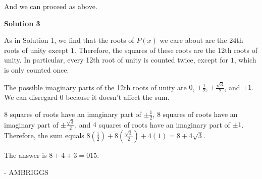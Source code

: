 \begin{enumerate}
 And we can proceed as above.

 



\textbf{Solution 3}

As in Solution 1, we find that the roots of $P(x)$ we care about are the 24th roots of unity except $1$. Therefore, the squares of these roots are the 12th roots of unity. In particular, every 12th root of unity is counted twice, except for $1$, which is only counted once. 

 The possible imaginary parts of the 12th roots of unity are $0$, $\pm\frac{1}{2}$, $\pm\frac{\sqrt{3}}{2}$, and $\pm 1$. We can disregard $0$ because it doesn't affect the sum. 

 $8$ squares of roots have an imaginary part of $\pm\frac{1}{2}$, $8$ squares of roots have an imaginary part of $\pm\frac{\sqrt{3}}{2}$, and $4$ squares of roots have an imaginary part of $\pm 1$. Therefore, the sum equals $8\left(\frac{1}{2}\right) + 8\left(\frac{\sqrt{3}}{2}\right) + 4(1) = 8 + 4\sqrt{3}$.

 The answer is $8+4+3=\boxed{015}$.

 - AMBRIGGS

 


\end{enumerate}